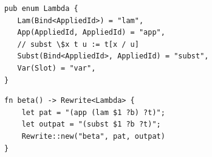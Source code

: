 
\begin{listing}
	\begin{verbatim}
pub enum Lambda {
   Lam(Bind<AppliedId>) = "lam",
   App(AppliedId, AppliedId) = "app",
   // subst \$x t u := t[x / u]
   Subst(Bind<AppliedId>, AppliedId) = "subst",
   Var(Slot) = "var",
}
	\end{verbatim}
	\caption{$\lambda_{\text{lsub}}$ syntax definition in slotted e-graphs}
	\label{listing:define_language}
\end{listing}


\begin{listing}
	\begin{verbatim}
fn beta() -> Rewrite<Lambda> {
    let pat = "(app (lam $1 ?b) ?t)";
    let outpat = "(subst $1 ?b ?t)";
    Rewrite::new("beta", pat, outpat)
}
	\end{verbatim}
	\caption{$\lambda_{\text{lsub}}$ $d\beta$-rule}
	\label{listing:lsub_beta_rule}
\end{listing}



